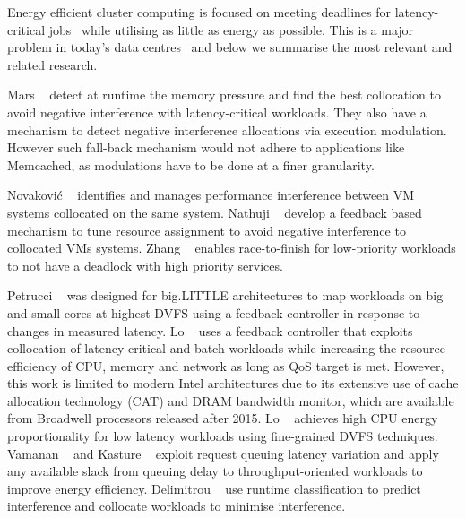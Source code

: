 Energy efficient cluster computing is focused on meeting deadlines for latency-critical
jobs~\citep{Barroso2003WebArchitecture, 199376, Nishtala2013ScalingFacebook, Atikoglu2012WorkloadStore, villebonnet:hal-01355452} while utilising as little as energy
as possible. This is a major problem in today's data
centres~\citep{Prekas:2015:EPW:2806777.2806848, Kasture2015Rubik, Hoelzle2009TheMachinesb, Wong:2016:PEA:3007787.3001188} and below we summarise the most relevant and
related research.

Mars \etal~\citep{Mars:2011:BIU:2155620.2155650, Yang2013Bubble-flux} detect
at runtime the memory pressure and find the best collocation to avoid negative
interference with latency-critical workloads. They also have a mechanism to detect
negative interference allocations via execution modulation. However such fall-back
mechanism would not adhere to applications like Memcached, as modulations have to be done
at a finer granularity.

 Novakovi\'{c} \etal~\citep{Novakovic2013DeepDive:Environments} identifies and manages performance
interference between VM systems collocated on the same system.
Nathuji \etal~\citep{Nathuji2010Q-clouds} develop a feedback based mechanism to tune resource
assignment to avoid negative interference to collocated VMs systems.
Zhang \etal~\citep{Zhang2013CPI2} enables race-to-finish for low-priority workloads to not have a
deadlock with high priority services.  


Petrucci \etal~\citep{Petrucci2015Octopus-Man:Computers} was designed for big.LITTLE
architectures to map workloads on big and small cores at highest DVFS using a feedback
controller in response to changes in measured latency. Lo \etal~\citep{Lo2015Heracles}
uses a feedback controller that exploits collocation of latency-critical and batch
workloads while increasing the resource efficiency of CPU, memory and network as long as
QoS target is met. However, this work is limited to modern Intel architectures due to its
extensive use of cache allocation technology (CAT) and DRAM bandwidth monitor, which are
available from Broadwell processors released after 2015.
Lo \etal~\citep{Lo2014TowardsWorkloads} achieves high CPU energy proportionality for low
latency workloads using fine-grained DVFS techniques.
Vamanan \etal~\citep{Vamanan2015TimeTrader:Search} and Kasture \etal~\citep{Kasture2015Rubik} exploit
request queuing latency variation and apply any available slack from queuing delay to
throughput-oriented workloads to improve energy efficiency.
Delimitrou \etal~\citep{Delimitrou2014Quasar} use runtime classification to predict interference and
collocate workloads to minimise interference. 

